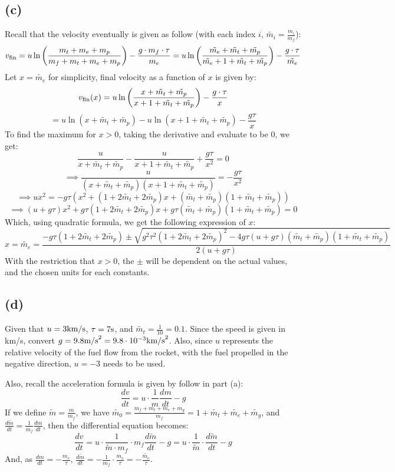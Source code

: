 \documentclass{article}
\begin{document}
\subsection*{(c)}
Recall that the velocity eventually is given as follow (with each index $i$, $\tilde{m_i} = \frac{m_i}{m_f}$):
$$v_\textmd{fin} = u\ln\left(\frac{m_t+m_e+m_p}{m_f+m_t+m_e+m_p}\right)-\frac{g\cdot m_f\cdot\tau}{m_e} = u\ln\left(\frac{\tilde{m_e}+\tilde{m_t}+\tilde{m_p}}{\tilde{m_e}+1+\tilde{m_t}+\tilde{m_p}}\right) - \frac{g\cdot \tau}{\tilde{m_e}}$$
Let $x=\tilde{m_e}$ for simplicity, final velocity as a function of $x$ is given by:
$$v_\textmd{fin}(x) = u\ln\left(\frac{x+\tilde{m_t}+\tilde{m_p}}{x+1+\tilde{m_t}+\tilde{m_p}}\right) - \frac{g\cdot\tau}{x}$$
$$ = u\ln(x+\tilde{m_t}+\tilde{m_p})-u\ln(x+1+\tilde{m_t}+\tilde{m_p})-\frac{g\tau}{x}$$
To find the maximum for $x>0$, taking the derivative and evaluate to be $0$, we get:
$$\frac{u}{x+\tilde{m_t}+\tilde{m_p}}-\frac{u}{x+1+\tilde{m_t}+\tilde{m_p}}+\frac{g\tau}{x^2} = 0$$
$$\implies \frac{u}{(x+\tilde{m_t}+\tilde{m_p})(x+1+\tilde{m_t}+\tilde{m_p})}=-\frac{g\tau}{x^2}$$
$$\implies ux^2 = -g\tau(x^2+(1+2\tilde{m_t}+2\tilde{m_p})x+(\tilde{m_t}+\tilde{m_p})(1+\tilde{m_t}+\tilde{m_p}))$$
$$\implies (u+g\tau)x^2+g\tau(1+2\tilde{m_t}+2\tilde{m_p})x+g\tau(\tilde{m_t}+\tilde{m_p})(1+\tilde{m_t}+\tilde{m_p})=0$$
Which, using quadratic formula, we get the following expression of $x$:
$$x=\tilde{m_e}=\frac{-g\tau(1+2\tilde{m_t}+2\tilde{m_p})\pm\sqrt{g^2\tau^2(1+2\tilde{m_t}+2\tilde{m_p})^2-4g\tau(u+g\tau)(\tilde{m_t}+\tilde{m_p})(1+\tilde{m_t}+\tilde{m_p})}}{2(u+g\tau)}$$
With the restriction that $x>0$, the $\pm$ will be dependent on the actual values, and the chosen units for each constants.

\subsection*{(d)}
Given that $u=3\textmd{km/s}$, $\tau = 7\textmd{s}$, and $\tilde{m_t}=\frac{1}{10}=0.1$. Since the speed is given in km/s, convert $g = 9.8 \textmd{m/s}^2 = 9.8\cdot 10^{-3}\textmd{km/s}^2$. Also, since $u$ represents the relative velocity of the fuel flow from the rocket, with the fuel propelled in the negative direction, $u=-3$ needs to be used.

Also, recall the acceleration formula is given by follow in part (a):
$$\frac{dv}{dt}=u\cdot\frac{1}{m}\frac{dm}{dt}-g$$
If we define $\tilde{m} = \frac{m}{m_f}$, we have $\tilde{m_0} = \frac{m_f+m_t+m_e+m_g}{m_f} = 1+\tilde{m_t}+\tilde{m_e}+\tilde{m_g}$, and $\frac{d\tilde{m}}{dt} = \frac{1}{m_f}\frac{dm}{dt}$, then the differential equation becomes:
$$\frac{dv}{dt}=u\cdot \frac{1}{\tilde{m}\cdot m_f}\cdot m_f\frac{d\tilde{m}}{dt}-g = u\cdot\frac{1}{\tilde{m}}\cdot\frac{d\tilde{m}}{dt}-g$$
And, as $\frac{dm}{dt} = -\frac{m_e}{\tau}$, $\frac{d\tilde{m}}{dt} = -\frac{1}{m_f}\cdot \frac{m_e}{\tau} = -\frac{\tilde{m_e}}{\tau}$.
\end{document}
